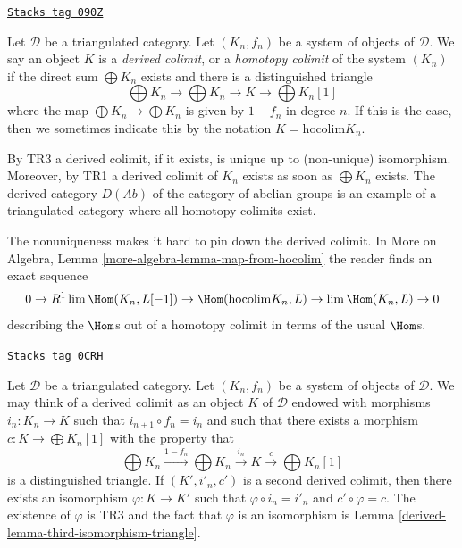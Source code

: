 \begin{definition}
\label{derived-definition-derived-colimit}
\href{https://stacks.math.columbia.edu/tag/090Z}{\texttt{Stacks tag 090Z}}

Let $\mathcal{D}$ be a triangulated category.
Let $(K_n, f_n)$ be a system of objects of $\mathcal{D}$.
We say an object $K$ is a {\it derived colimit}, or a
{\it homotopy colimit} of the system $(K_n)$ if
the direct sum $\bigoplus K_n$ exists and there is a distinguished triangle
$$
\bigoplus K_n \to \bigoplus K_n \to K \to \bigoplus K_n[1]
$$
where the map $\bigoplus K_n \to \bigoplus K_n$ is given
by $1 - f_n$ in degree $n$. If this is the
case, then we sometimes indicate this by the notation
$K = \text{hocolim} K_n$.
\end{definition}

By TR3 a derived colimit, if it exists, is unique up to (non-unique)
isomorphism. Moreover, by TR1 a derived colimit of $K_n$ exists
as soon as $\bigoplus K_n$ exists. The derived category $D(\textit{Ab})$
of the category of abelian groups is an example of a triangulated
category where all homotopy colimits exist.

\medskip\noindent
The nonuniqueness makes it hard to pin down the derived colimit. In
More on Algebra, Lemma \ref{more-algebra-lemma-map-from-hocolim}
the reader finds an exact sequence
$$
0 \to R^1\lim \Hom(K_n, L[-1]) \to \Hom(\text{hocolim} K_n, L)
\to \lim \Hom(K_n, L) \to 0
$$
describing the $\Hom$s out of a homotopy colimit in terms of the
usual $\Hom$s.

\begin{remark}
\label{derived-remark-uniqueness-derived-colimit}
\href{https://stacks.math.columbia.edu/tag/0CRH}{\texttt{Stacks tag 0CRH}}

Let $\mathcal{D}$ be a triangulated category.
Let $(K_n, f_n)$ be a system of objects of $\mathcal{D}$.
We may think of a derived colimit as an object $K$
of $\mathcal{D}$ endowed with morphisms $i_n : K_n \to K$
such that $i_{n + 1} \circ f_n = i_n$ and such that there
exists a morphism $c : K \to \bigoplus K_n[1]$ with the property that
$$
\bigoplus K_n \xrightarrow{1 - f_n} \bigoplus K_n \xrightarrow{i_n}
K \xrightarrow{c} \bigoplus K_n[1]
$$
is a distinguished triangle. If $(K', i'_n, c')$ is a second
derived colimit, then there exists an isomorphism
$\varphi : K \to K'$ such that $\varphi \circ i_n = i'_n$ and
$c' \circ \varphi = c$. The existence of $\varphi$ is
TR3 and the fact that $\varphi$ is an isomorphism is
Lemma \ref{derived-lemma-third-isomorphism-triangle}.
\end{remark}

